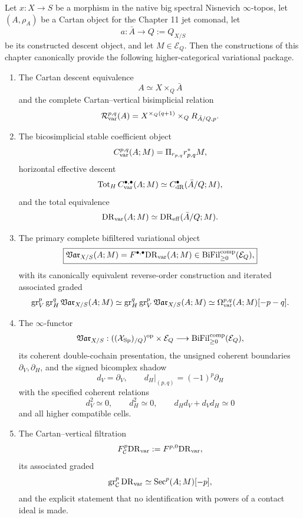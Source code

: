 \begin{theorem}
\label{thm:var-final-package}
Let \(x:X\to S\) be a morphism in the native big spectral Nisnevich \(\infty\)-topos, let \((A,\rho_A)\) be a Cartan object for the Chapter 11 jet comonad, let
\[
    a:\bar A\to Q:=Q_{X/S}
\]
be its constructed descent object, and let \(M\in\mathcal E_Q\). Then the constructions of this chapter canonically provide the following higher-categorical variational package.

\begin{enumerate}
\item The Cartan descent equivalence
\[
    A\simeq X\times_Q\bar A
\]
and the complete Cartan--vertical bisimplicial relation
\[
    \mathcal R_{\mathrm{var}}^{p,q}(A)
    =
    X^{\times_Q(q+1)}\times_QR_{\bar A/Q,p}.
\]

\item The bicosimplicial stable coefficient object
\[
    C_{\mathrm{var}}^{p,q}(A;M)
    =
    \Pi_{r_{p,q}}r_{p,q}^*M,
\]
horizontal effective descent
\[
    \operatorname{Tot}_HC_{\mathrm{var}}^{\bullet,\bullet}(A;M)
    \simeq
    C_{\mathrm{dR}}^{\bullet}(\bar A/Q;M),
\]
and the total equivalence
\[
    \mathrm{DR}_{\mathrm{var}}(A;M)
    \simeq
    \mathrm{DR}_{\mathrm{eff}}(\bar A/Q;M).
\]

\item The primary complete bifiltered variational object
\[
    \boxed{
    \mathfrak{Var}_{X/S}(A;M)
    =
    F^{\bullet,\bullet}\mathrm{DR}_{\mathrm{var}}(A;M)
    \in
    \operatorname{BiFil}^{\mathrm{comp}}_{\ge0}(\mathcal E_Q),
    }
\]
with its canonically equivalent reverse-order construction and iterated associated graded
\[
    \operatorname{gr}_V^p\operatorname{gr}_H^q\mathfrak{Var}_{X/S}(A;M)
    \simeq
    \operatorname{gr}_H^q\operatorname{gr}_V^p\mathfrak{Var}_{X/S}(A;M)
    \simeq
    \Omega_{\mathrm{var}}^{p,q}(A;M)[-p-q].
\]

\item The \(\infty\)-functor
\[
    \mathfrak{Var}_{X/S}:
    ((\mathcal{X}_{\mathrm{Sp}})_{/Q})^{\mathrm{op}}\times\mathcal E_Q
    \longrightarrow
    \operatorname{BiFil}^{\mathrm{comp}}_{\ge0}(\mathcal E_Q),
\]
its coherent double-cochain presentation, the unsigned coherent boundaries \(\partial_V,\partial_H\), and the signed bicomplex shadow
\[
    d_V=\partial_V,
    \qquad
    d_H|_{(p,q)}=(-1)^p\partial_H
\]
with the specified coherent relations
\[
    d_V^2\simeq0,
    \qquad
    d_H^2\simeq0,
    \qquad
    d_Hd_V+d_Vd_H\simeq0
\]
and all higher compatible cells.

\item The Cartan--vertical filtration
\[
    F_{\mathcal C}^p\mathrm{DR}_{\mathrm{var}}:=F^{p,0}\mathrm{DR}_{\mathrm{var}},
\]
its associated graded
\[
    \operatorname{gr}_{\mathcal C}^p\mathrm{DR}_{\mathrm{var}}
    \simeq
    \operatorname{Sec}^p(A;M)[-p],
\]
and the explicit statement that no identification with powers of a contact ideal is made.


\end{enumerate}
\end{theorem}
